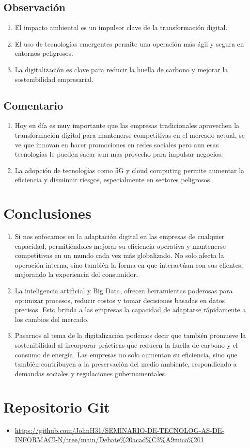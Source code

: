 \documentclass[12pt]{article}
\begin{document}
\subsection*{Observación}
\begin{enumerate}
    \item El impacto ambiental es un impulsor clave de la transformación digital. 
    \item El uso de tecnologías emergentes permite una operación más ágil y segura en entornos peligrosos.
    \item La digitalización es clave para reducir la huella de carbono y mejorar la sostenibilidad empresarial.
\end{enumerate}

\subsection*{Comentario}
\begin{enumerate}
    \item Hoy en día es muy importante que las empresas tradicionales aprovechen la transformación digital para mantenerse competitivas en el mercado actual, se ve que innovan en hacer promociones en redes sociales pero aun esas tecnologías le pueden sacar aun mas provecho para impulsar negocios. 
    \item La adopción de tecnologías como 5G y cloud computing permite aumentar la eficiencia y disminuir riesgos, especialmente en sectores peligrosos.
\end{enumerate}

\section*{Conclusiones}
\begin{enumerate}
    \item Si nos enfocamos en la adaptación digital en las empresas de cualquier capacidad, permitiéndoles mejorar su eficiencia operativa y mantenerse competitivas en un mundo cada vez más globalizado. No solo afecta la operación interna, sino también la forma en que interactúan con sus clientes, mejorando la experiencia del consumidor.
    \item La inteligencia artificial y Big Data, ofrecen herramientas poderosas para optimizar procesos, reducir costos y tomar decisiones basadas en datos precisos. Esto brinda a las empresas la capacidad de adaptarse rápidamente a los cambios del mercado.
    \item Pasarnos al tema de la digitalización podemos decir que también promueve la sostenibilidad al incorporar prácticas que reducen la huella de carbono y el consumo de energía. Las empresas no solo aumentan su eficiencia, sino que también contribuyen a la preservación del medio ambiente, respondiendo a demandas sociales y regulaciones gubernamentales.
\end{enumerate}




\section*{Repositorio Git}
\begin{itemize}
    \item \url{https://github.com/JohnH31/SEMINARIO-DE-TECNOLOG-AS-DE-INFORMACI-N/tree/main/Debate%20acad%C3%A9mico%201}
\end{itemize}
\end{document}
